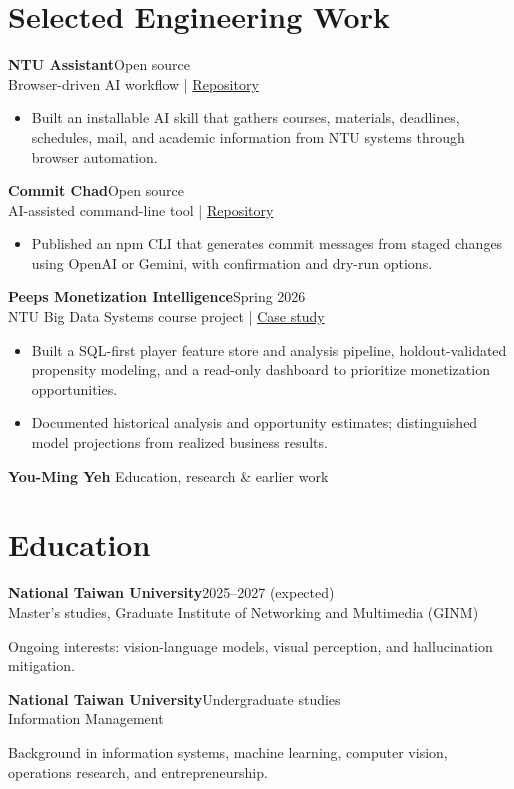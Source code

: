 \documentclass[10pt,a4paper]{article}
\newcommand{\entry}[3]{\textbf{#1}\hfill{\small\color{muted}#2}\\{\small #3}\par}
\begin{document}
\section{Selected Engineering Work}
\entry{NTU Assistant}{Open source}{Browser-driven AI workflow \enspace | \enspace \href{https://github.com/YouMingYeh/ntu}{Repository}}
\begin{itemize}
\item Built an installable AI skill that gathers courses, materials, deadlines, schedules, mail, and academic information from NTU systems through browser automation.
\end{itemize}
\entry{Commit Chad}{Open source}{AI-assisted command-line tool \enspace | \enspace \href{https://github.com/YouMingYeh/commit-chad}{Repository}}
\begin{itemize}
\item Published an npm CLI that generates commit messages from staged changes using OpenAI or Gemini, with confirmation and dry-run options.
\end{itemize}
\entry{Peeps Monetization Intelligence}{Spring 2026}{NTU Big Data Systems course project \enspace | \enspace \href{https://github.com/YouMingYeh/r14944035-bds-final}{Case study}}
\begin{itemize}
\item Built a SQL-first player feature store and analysis pipeline, holdout-validated propensity modeling, and a read-only dashboard to prioritize monetization opportunities.
\item Documented historical analysis and opportunity estimates; distinguished model projections from realized business results.
\end{itemize}

\newpage
{\large\bfseries You-Ming Yeh}\hfill{\small\color{muted} Education, research \& earlier work}

\section{Education}
\entry{National Taiwan University}{2025--2027 (expected)}{Master's studies, Graduate Institute of Networking and Multimedia (GINM)}
Ongoing interests: vision-language models, visual perception, and hallucination mitigation.

\entry{National Taiwan University}{Undergraduate studies}{Information Management}
Background in information systems, machine learning, computer vision, operations research, and entrepreneurship.
\end{document}
